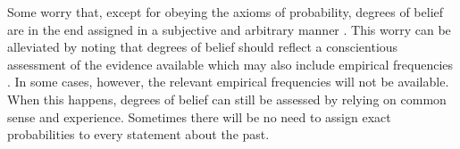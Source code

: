 \documentclass{article}
\newcommand{\pr}{\mathsf{Pr}}
\begin{document}
Some worry that, except for obeying the axioms of probability, degrees of belief are in the end assigned 
in a subjective and arbitrary manner \citep{AllenPardo2019relative}. 
This worry can be  alleviated by noting that degrees of belief should reflect a conscientious assessment of the evidence available which may also include empirical frequencies \citep[see~\ref{sec:fallacies} below and the examples in ][]{enfs2015}. 
%
In some cases, however, the relevant empirical frequencies will not be available. %
When this happens, degrees of belief can still be assessed by relying on common sense and experience. %
%
%
Sometimes there will be no need to assign exact probabilities to every statement about the past. 
\end{document}
